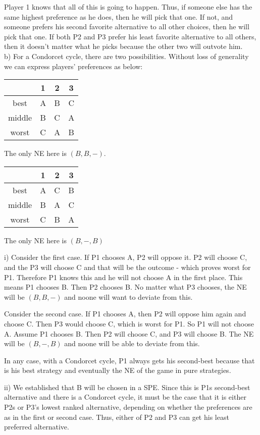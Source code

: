 \documentclass[letter,11pt]{article}
\begin{document}
Player 1 knows that all of this is going to happen. Thus, if someone else has the same highest preference as he does, then he will pick that one. If not, and someone prefers his second favorite alternative to all other choices, then he will pick that one. If both P2 and P3 prefer his least favorite alternative to all others, then it doesn't matter what he picks because the other two will outvote him. \\

b) For a Condorcet cycle, there are two possibilities. Without loss of generality we can express players' preferences as below:
\begin{center}
  \begin{tabular}{   c   c   c  c  }
    \hline
     & 1 & 2 & 3 \\ \hline
    best & A & B & C \\ 
   middle & B & C & A \\ 
   worst & C & A & B \\ \hline
  \end{tabular}
\end{center}
The only NE here is $(B,B,-)$.
\begin{center}
  \begin{tabular}{   c   c   c  c  }
    \hline
     & 1 & 2 & 3 \\ \hline
    best & A & C & B \\ 
   middle & B & A & C \\ 
   worst & C & B & A \\ \hline
  \end{tabular}
\end{center}
The only NE here is $(B,-,B)$

i) Consider the first case. If P1 chooses A, P2 will oppose it. P2 will choose C, and the P3 will choose C and that will be the outcome - which proves worst for P1. Therefore P1 knows this and he will not choose A in the first place. This means P1 chooses B. Then P2 chooses B. No matter what P3 chooses, the NE will be $(B,B,-)$ and noone will want to deviate from this.

Consider the second case. If P1 chooses A, then P2 will oppose him again and choose C. Then P3 would choose C, which is worst for P1. So P1 will not choose A. Assume P1 chooses B. Then P2 will choose C, and P3 will choose B. The NE will be $(B,-,B)$ and noone will be able to deviate from this. 

In any case, with a Condorcet cycle, P1 always gets his second-best because that is his best strategy and eventually the NE of the game in pure strategies. 


ii) We established that B will be chosen in a SPE. Since this is P1s second-best alternative and there is a Condorcet cycle, it must be the case that it is either P2s or P3's lowest ranked alternative, depending on whether the preferences are as in the first or second case. Thus, either of P2 and P3 can get his least preferred alternative. 
\end{document}
